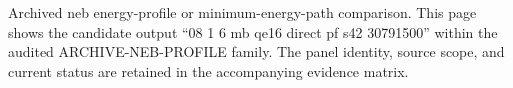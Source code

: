 Archived neb energy-profile or minimum-energy-path comparison. This page shows the candidate output ``08 1 6 mb qe16 direct pf s42 30791500'' within the audited ARCHIVE-NEB-PROFILE family. The panel identity, source scope, and current status are retained in the accompanying evidence matrix.
